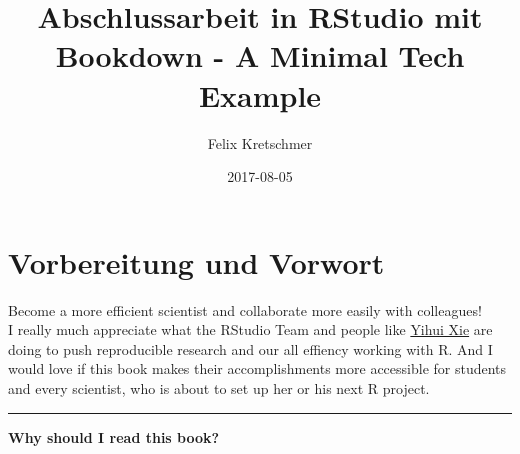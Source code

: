 \documentclass[]{book}
\title{Abschlussarbeit in RStudio mit Bookdown - A Minimal Tech Example}
\author{Felix Kretschmer}
\date{2017-08-05}
\theoremstyle{definition}
\theoremstyle{definition}
\theoremstyle{remark}
\begin{document}
\maketitle

{
\setcounter{tocdepth}{1}
\tableofcontents
}
\listoftables
\listoffigures
\chapter*{Vorbereitung und Vorwort}\label{vorbereitung-und-vorwort}

Become a more efficient scientist and collaborate more easily with
colleagues!\\
I really much appreciate what the RStudio Team and people like
\href{https://yihui.name/}{Yihui Xie} are doing to push reproducible
research and our all effiency working with R. And I would love if this
book makes their accomplishments more accessible for students and every
scientist, who is about to set up her or his next R project.

\begin{center}\rule{0.5\linewidth}{\linethickness}\end{center}

\textbf{Why should I read this book?}
\end{document}
